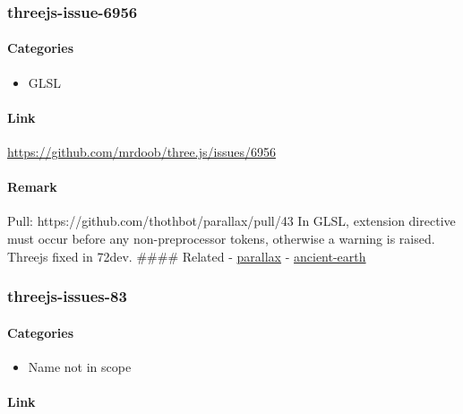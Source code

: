 \subsubsection{threejs-issue-6956}\label{threejs-issue-6956}

\paragraph{Categories}\label{categories-3}

\begin{itemize}
\tightlist
\item
  GLSL
\end{itemize}

\paragraph{Link}\label{link-13}

\url{https://github.com/mrdoob/three.js/issues/6956}

\paragraph{Remark}\label{remark-13}

Pull: https://github.com/thothbot/parallax/pull/43 In GLSL, extension
directive must occur before any non-preprocessor tokens, otherwise a
warning is raised. Threejs fixed in 72dev. \#\#\#\# Related -
\href{https://github.com/thothbot/parallax/pull/43}{parallax} -
\href{https://github.com/typpo/ancient-earth/commit/91f9d75ab45db8e7ba3d2e156e313f079f6826ed}{ancient-earth}

\subsubsection{threejs-issues-83}\label{threejs-issues-83}

\paragraph{Categories}\label{categories-4}

\begin{itemize}
\tightlist
\item
  Name not in scope
\end{itemize}

\paragraph{Link}\label{link-14}

